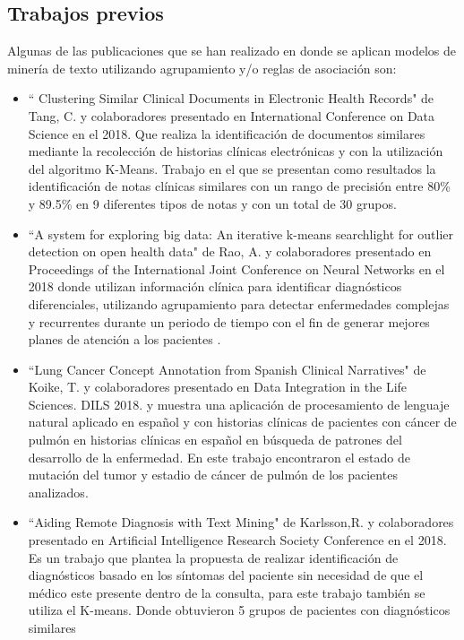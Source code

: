 \subsection*{Trabajos previos}

Algunas de las publicaciones que se han realizado en donde se aplican modelos de minería de texto utilizando agrupamiento y/o reglas de asociación son:

\begin{itemize}
	\item ``
	Clustering Similar Clinical Documents in Electronic Health Records" de Tang, C. y colaboradores presentado en International Conference on Data Science en el 2018. Que realiza la identificación de documentos similares mediante la recolección de historias clínicas electrónicas y con la utilización del algoritmo K-Means. Trabajo en el que se presentan como resultados la identificación de notas clínicas similares con un rango de precisión entre 80\% y 89.5\% en 9 diferentes tipos de notas y con un total de 30 grupos.
	
	\item ``A system for exploring big data: An iterative k-means searchlight for outlier detection on open health data" de Rao, A. y colaboradores presentado en Proceedings of the International Joint Conference on Neural Networks en el 2018 donde utilizan información clínica para identificar diagnósticos diferenciales, utilizando agrupamiento para detectar enfermedades complejas y recurrentes durante un periodo de tiempo con el fin de generar mejores planes de atención a los pacientes .  
	
	\item ``Lung Cancer Concept Annotation from Spanish Clinical Narratives" de Koike, T. y colaboradores presentado en  Data Integration in the Life Sciences. DILS 2018. y muestra una aplicación de procesamiento de lenguaje natural aplicado en español y con historias clínicas de pacientes con cáncer de pulmón en historias clínicas en español en búsqueda de patrones del desarrollo de la enfermedad. En este trabajo encontraron el estado de mutación del tumor y estadio de cáncer de pulmón de los pacientes analizados. 
	
	\item ``Aiding Remote Diagnosis with Text Mining" de Karlsson,R. y colaboradores presentado en Artificial Intelligence Research Society Conference en el 2018. Es un trabajo que plantea la propuesta de realizar identificación de diagnósticos basado en los síntomas del paciente sin necesidad de que el médico este presente dentro de la consulta, para este trabajo también se utiliza el K-means.  Donde obtuvieron 5 grupos de pacientes con diagnósticos similares 
	

\end{itemize}
